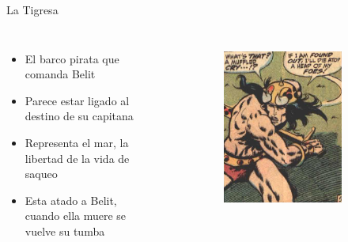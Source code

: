 \begin{frame}{La Tigresa}
	\begin{columns}
		\begin{itemize}
			\item El barco pirata que comanda Belit
			\item Parece estar ligado al destino de su capitana
			\item Representa el mar, la libertad de la vida de saqueo
			\item Esta atado a Belit, cuando ella muere se vuelve su tumba
		\end{itemize}
		\begin{figure}[htp]
			\centering
			\begin{subfigure}[b]{0.3\textwidth}
				\includegraphics[width=\textwidth]{img/conan/CTB}
			\end{subfigure}
			~
			\begin{subfigure}[b]{0.27\textwidth}

\end{subfigure}
\end{figure}
\end{columns}
\end{frame}
